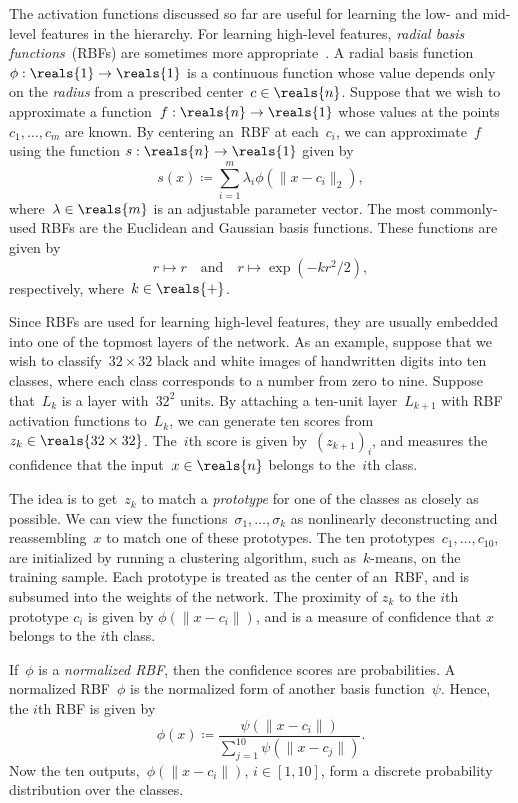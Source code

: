 \documentclass[11pt,a4paper]{article}
\numberwithin{equation}{section}
\begin{document}
The activation functions discussed so far are useful for learning the low- and
mid-level features in the hierarchy. For learning high-level features,
\emph{radial basis functions}~(RBFs) are sometimes more
appropriate~\citep{lecun-01a}. A radial basis function~$\phi : \reals{1} \to
\reals{1}$ is a continuous function whose value depends only on the
\emph{radius} from a prescribed center~$c \in \reals{n}$. Suppose that we wish
to approximate a function~$f : \reals{n} \to \reals{1}$ whose values at the
points~$c_1, \ldots, c_m$ are known. By centering an~RBF at each~$c_i$, we can
approximate~$f$ using the function $s : \reals{n} \to \reals{1}$ given by
\begin{equation}
	s(x) \coloneqq \sum_{i = 1}^m \lambda_i \phi(\|x - c_i\|_2),
	\label{eq:rbf_sum}
\end{equation}
where~$\lambda \in \reals{m}$ is an adjustable parameter vector. The most
commonly-used RBFs are the Euclidean and Gaussian basis functions. These
functions are given by
\[
	r \mapsto r \quad\text{and}\quad r \mapsto \exp(-k r^2 / 2),
\]
respectively, where~$k \in \reals{+}$.

Since RBFs are used for learning high-level features, they are usually embedded
into one of the topmost layers of the network. As an example, suppose that we
wish to classify~$32 \times 32$ black and white images of handwritten digits
into ten classes, where each class corresponds to a number from zero to nine.
Suppose that~$L_k$ is a layer with~$32^2$ units. By attaching a ten-unit
layer~$L_{k + 1}$ with RBF activation functions to~$L_k$, we can generate ten
scores from~$z_k \in \reals{32 \times 32}$. The~$i$th score is given by~$(z_{k +
1})_i$, and measures the confidence that the input~$x \in \reals{n}$ belongs to
the~$i$th class.

The idea is to get~$z_k$ to match a \emph{prototype} for one of the classes as
closely as possible. We can view the functions~$\sigma_1, \ldots, \sigma_k$ as
nonlinearly deconstructing and reassembling~$x$ to match one of these
prototypes. The ten prototypes~$c_1, \ldots, c_{10}$, are initialized by running
a clustering algorithm, such as~$k$-means, on the training sample. Each
prototype is treated as the center of an~RBF, and is subsumed into the weights
of the network. The proximity of $z_k$ to the $i$th prototype $c_i$ is given by
$\phi(\|x - c_i\|)$, and is a measure of confidence that $x$ belongs to the
$i$th class.

If~$\phi$ is a \emph{normalized RBF}, then the confidence scores are
probabilities. A normalized RBF~$\phi$ is the normalized form of another basis
function~$\psi$. Hence, the $i$th RBF is given by
\begin{equation}
	\phi(x) \coloneqq \frac{\psi(\|x - c_i\|)}
		{\sum_{j = 1}^{10} \psi(\|x - c_j\|)}.
	\label{eq:normalized_rbf}
\end{equation}
Now the ten outputs,~$\phi(\|x - c_i\|)$, $i \in [1, 10]$, form a discrete
probability distribution over the classes.
\end{document}
